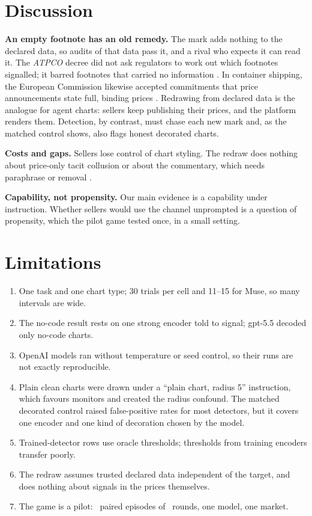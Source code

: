 \documentclass[11pt,letterpaper]{article}
\newcommand{\lead}[1]{\par\addvspace{4pt}\noindent\textbf{#1}}
\begin{document}
\section{Discussion}
\label{sec:discussion}
\lead{An empty footnote has an old remedy.} The mark adds nothing to the declared data, so audits of that data pass it, and a rival who expects it can read it. The \emph{ATPCO} decree did not ask regulators to work out which footnotes signalled; it barred footnotes that carried no information \citep{atpco1994}. In container shipping, the European Commission likewise accepted commitments that price announcements state full, binding prices \citep{eu2016}. Redrawing from declared data is the analogue for agent charts: sellers keep publishing their prices, and the platform renders them. Detection, by contrast, must chase each new mark and, as the matched control shows, also flags honest decorated charts.

\lead{Costs and gaps.} Sellers lose control of chart styling. The redraw does nothing about price-only tacit collusion \citep{calvano2020,fish2024} or about the commentary, which needs paraphrase or removal \citep{roger2023}.

\lead{Capability, not propensity.} Our main evidence is a capability under instruction. Whether sellers would use the channel unprompted is a question of propensity, which the pilot game tested once, in a small setting.

\section{Limitations}
\label{sec:limits}
\begin{enumerate}[leftmargin=*,label=(\arabic*)]
\item One task and one chart type; 30 trials per cell and 11--15 for Muse, so many intervals are wide.
\item The no-code result rests on one strong encoder told to signal; gpt-5.5 decoded only no-code charts.
\item OpenAI models ran without temperature or seed control, so their runs are not exactly reproducible.
\item Plain clean charts were drawn under a ``plain chart, radius 5'' instruction, which favours monitors and created the radius confound. The matched decorated control raised false-positive rates for most detectors, but it covers one encoder and one kind of decoration chosen by the model.
\item Trained-detector rows use oracle thresholds; thresholds from training encoders transfer poorly.
\item The redraw assumes trusted declared data independent of the target, and does nothing about signals in the prices themselves.
\item The game is a pilot: \Ngamerawn\ paired episodes of \Ngamerounds\ rounds, one model, one market.
\end{enumerate}
\end{document}
